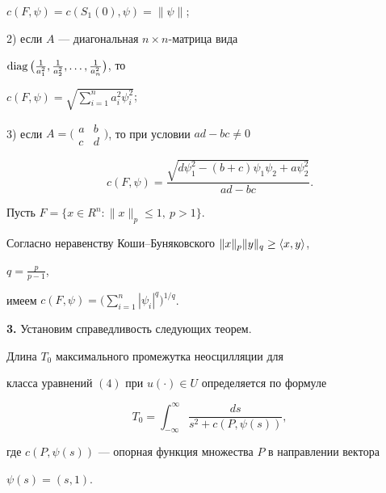 \begin{exam}
$c(F,\psi)=c(S_1(0),\psi)=\|\psi\|$; 


 


2) если $A$ --- диагональная $n\times n$-матрица вида 


$\diag\big(\frac{1}{a^2_1},\frac{1}{a^2_2},\dotsc, 


\frac{1}{a^2_n}\big)$, то 


$c(F,\psi)=\sqrt{\sum\limits^n_{i=1}a^2_i\psi^2_i}$; 


 


3) если $A=\big(\begin{smallmatrix} a & b \\ c & d 


\end{smallmatrix}\big)$, то при условии $a d-b c\ne0$ 


$$ 


c(F,\psi)=\frac{\sqrt{d\psi^2_1-(b+c)\psi_1\psi_2+a\psi^2_2}} 


{a d-b c}. 


$$ 


\end{exam} 


 


\begin{exam} 


Пусть $F=\{x\in R^n:\|x\|_p\le1,\ p>1\}$. 


Согласно неравенству Коши--Буняковского $\|x\|_p\|y\|_q\ge\langle x,y\rangle$, 


$q=\frac{p}{p-1}$, 


имеем $c(F,\psi)=\Big(\sum\limits^n_{i=1}|\psi_i|^q\Big)^{1/q}$. 


\end{exam} 


 


{\bf 3.} Установим справедливость следующих теорем. 


 


\begin{thm} 


Длина $T_0$ максимального промежутка неосцилляции для 


класса уравнений $(4)$ при $u(\cdot)\in U$ определяется по формуле 


\begin{equation} 


T_0=\int^\infty_{-\infty}\frac{d s}{s^2+c(P,\psi(s))}, 


\end{equation} 


где $c(P,\psi(s))$ --- опорная функция множества $P$ в направлении вектора 


$\psi(s)=(s,1)$. 


\end{thm} 


